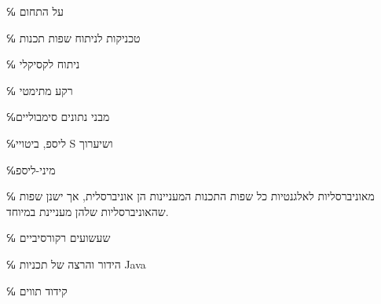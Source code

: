 \documentclass[12pt,reqno,fleqn]{book}
\begin{document}
\frontmatter
\maketitle

\mainmatter{}

℆ על התחום 

℆ טכניקות לניתוח שפות תכנות

℆ ניתוח לקסיקלי 

℆ רקע מתימטי

℆מבני נתונים סימבוליים


℆ליספ, ביטויי S ושיערוך

℆מיני-ליספ

℆ מאוניברסליות לאלגנטיות 
כל שפות התכנות המעניינות הן אוניברסלית, אך ישנן שפות שהאוניברסליות שלהן מעניינת
במיוחד.

℆ שעשועים רקורסיביים  

℆ הידור והרצה של תכניות Java


℆ קידוד תווים
\end{document}
